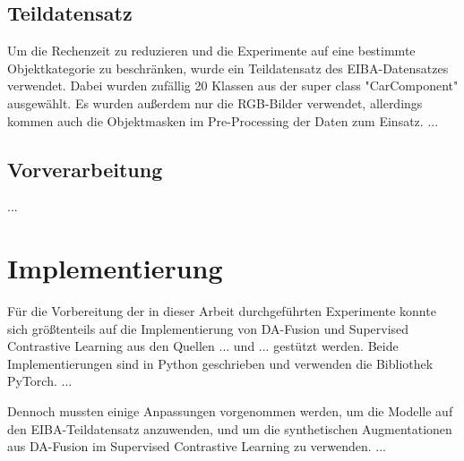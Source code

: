 

\subsection{Teildatensatz} \label{sec:subdataset}

Um die Rechenzeit zu reduzieren und die Experimente auf eine bestimmte Objektkategorie zu beschränken, wurde ein Teildatensatz des EIBA-Datensatzes verwendet. Dabei wurden zufällig 20 Klassen aus der super class "CarComponent" ausgewählt. Es wurden außerdem nur die RGB-Bilder verwendet, allerdings kommen auch die Objektmasken im Pre-Processing der Daten zum Einsatz. ...


\subsection{Vorverarbeitung} \label{sec:preprocessing}

...

\section{Implementierung} \label{sec:implementation}


Für die Vorbereitung der in dieser Arbeit durchgeführten Experimente konnte sich größtenteils auf die Implementierung von DA-Fusion und Supervised Contrastive Learning aus den Quellen ... und ... gestützt werden. Beide Implementierungen sind in Python geschrieben und verwenden die Bibliothek PyTorch. ...

Dennoch mussten einige Anpassungen vorgenommen werden, um die Modelle auf den EIBA-Teildatensatz anzuwenden, und um die synthetischen Augmentationen aus DA-Fusion im Supervised Contrastive Learning zu verwenden. ...

